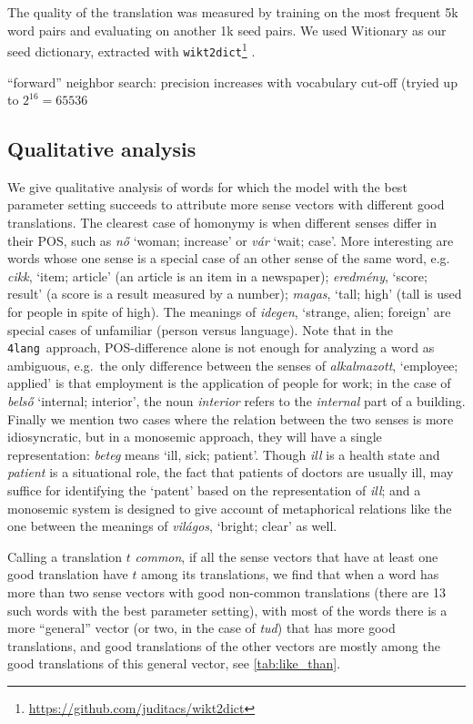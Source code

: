 \documentclass[11pt]{article}
\newcommand{\fl}{\texttt{4lang}}
\begin{document}
The quality of the translation was measured by training on the most frequent 5k
word pairs and evaluating on another 1k seed pairs.  We used Witionary as our
seed dictionary, extracted with
\texttt{wikt2dict}\footnote{\url{https://github.com/juditacs/wikt2dict}}
\citep{Acs:2016}. 

``forward'' neighbor search: precision increases with vocabulary cut-off
(tryied up to $2^{16}=65536$

\subsection{Qualitative analysis}

We give qualitative analysis of words for which the model with the best
parameter setting succeeds to attribute more sense vectors with different good
translations. The clearest case of homonymy is when different senses differ in
their POS, such as \emph{nő} `woman; increase' or \emph{vár} `wait; case'.
More interesting are words whose one sense is a special case of an other sense
of the same word, e.g.~ \emph{cikk}, `item; article' (an
article is an item in a newspaper); \emph{eredmény}, `score; result' (a score
is a result measured by a number); \emph{magas}, `tall; high' (tall is used for
people in spite of high). The meanings of \emph{idegen}, `strange, alien;
foreign' are special cases of unfamiliar (person versus language).  Note that
in the \fl~approach, POS-difference alone is not enough for analyzing a word as
ambiguous, e.g.~the only difference between the senses of \emph{alkalmazott},
`employee; applied' is that employment is the application of people for work;
in the case of \emph{belső} `internal; interior', the noun \emph{interior}
refers to the \emph{internal} part of a building. Finally we mention two cases
where the relation between the two senses is more idiosyncratic, but in a
monosemic approach, they will have a single representation: \emph{beteg} means
`ill, sick; patient'. Though \emph{ill} is a health state and \emph{patient} is
a situational role, the fact that patients of doctors are usually ill, may
suffice for identifying the `patent' based on the representation of
\emph{ill}; and a monosemic system is designed to give account of metaphorical
relations like the one between the meanings of \emph{világos}, `bright; clear'
as well.

Calling a translation $t$ \emph{common}, if all the sense vectors that have at
least one good translation have $t$ among its translations, we find that when a
word has more than two sense vectors with good non-common translations (there
are 13 such words with the best parameter setting), with most of the words
there is a more ``general'' vector (or two, in the case of \emph{tud}) that has
more good translations, and good translations of the other vectors are mostly
among the good translations of this general vector, see
\autoref{tab:like_than}.
\end{document}

